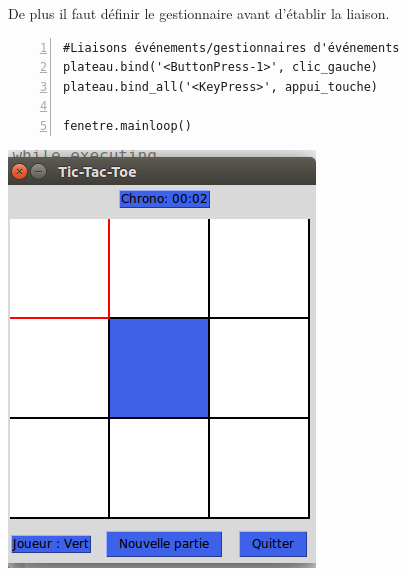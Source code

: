 \documentclass[a4paper, french, 12pt]{article}  %
\begin{document}
De plus il faut définir le gestionnaire avant d'établir la liaison.

\begin{lstlisting}[numbers=left]
#Liaisons événements/gestionnaires d'événements
plateau.bind('<ButtonPress-1>', clic_gauche)
plateau.bind_all('<KeyPress>', appui_touche)

fenetre.mainloop()
\end{lstlisting} 

\begin{center}
\includegraphics[scale=0.6]{graphiques/morpion-gestionnaire.png}
\end{center}
\end{document}
